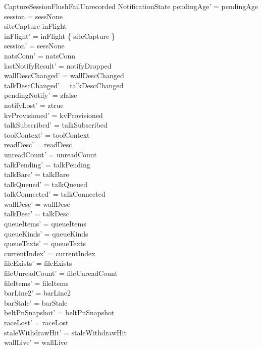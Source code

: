 \documentclass[a4paper,10pt,fleqn]{article}
\begin{document}
\begin{schema}{CaptureSessionFlushFailUnrecorded}
  \Delta NotificationState
  \where
  pendingAge' = pendingAge \\
  session = sessNone \\
  siteCapture \in inFlight \\
  inFlight' = inFlight \setminus \{ siteCapture \} \\
  session' = sessNone \\
  natsConn' = natsConn \\
  lastNotifyResult' = notifyDropped \\
  wallDescChanged' = wallDescChanged \\
  talkDescChanged' = talkDescChanged \\
  pendingNotify' = zfalse \\
  notifyLost' = ztrue \\
  kvProvisioned' = kvProvisioned \\
  talkSubscribed' = talkSubscribed \\
  toolContext' = toolContext \\
  readDesc' = readDesc \\
  unreadCount' = unreadCount \\
  talkPending' = talkPending \\
  talkBare' = talkBare \\
  talkQueued' = talkQueued \\
  talkConnected' = talkConnected \\
  wallDesc' = wallDesc \\
  talkDesc' = talkDesc \\
  queueItems' = queueItems \\
  queueKinds' = queueKinds \\
  queueTexts' = queueTexts \\
  currentIndex' = currentIndex \\
  fileExists' = fileExists \\
  fileUnreadCount' = fileUnreadCount \\
  fileItems' = fileItems \\
  barLine2' = barLine2 \\
  barStale' = barStale \\
  beltPnSnapshot' = beltPnSnapshot \\
  raceLost' = raceLost \\
  staleWithdrawHit' = staleWithdrawHit \\
  wallLive' = wallLive \\

\end{schema}
\end{document}
